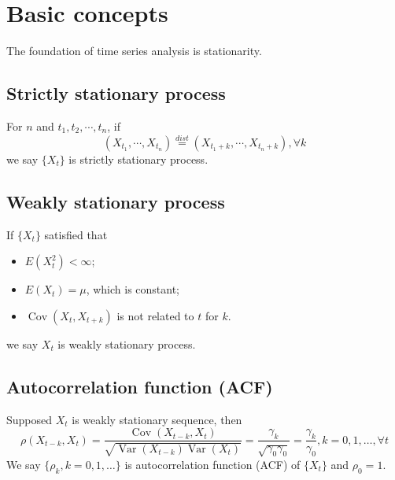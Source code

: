 \documentclass{article}
\title{\courseName}
\author{Thompson Hu}
\date{} %
\begin{document}
\maketitle
\thispagestyle{fancy}

\section{Basic concepts}
The foundation of time series analysis is stationarity.

\subsection{Strictly stationary process}
For $n$ and $t_1,t_2,\cdots,t_n$, if
\begin{equation*}
\left(X_{t_{1}}, \cdots, X_{t_{n}}\right) \stackrel{d i s t}{=}\left(X_{t_{1}+k}, \cdots, X_{t_{n}+k}\right), \forall k
\end{equation*}
we say $\{X_t\}$ is strictly stationary process.

\subsection{Weakly stationary process}
If $\{X_t\}$ satisfied that
\begin{itemize}
	\item $E\left(X_{t}^{2}\right)<\infty$;
	\item $E(X_t) = \mu$, which is constant;
	\item $\operatorname{Cov}\left(X_{t}, X_{t+k}\right)$ is not related to $t$ for $k$.
\end{itemize}
we say $X_t$ is weakly stationary process.

\subsection{Autocorrelation function (ACF)}
Supposed $X_t$ is weakly stationary sequence, then
\begin{equation}\label{acf1}
\rho\left(X_{t-k}, X_{t}\right)=\frac{\operatorname{Cov}\left(X_{t-k}, X_{t}\right)}{\sqrt{\operatorname{Var}\left(X_{t-k}\right) \operatorname{Var}\left(X_{t}\right)}}=\frac{\gamma_{k}}{\sqrt{\gamma_{0} \gamma_{0}}}=\frac{\gamma_{k}}{\gamma_{0}}, k=0,1, \ldots, \forall t
\end{equation}
We say $\{\rho_k, k = 0, 1, \dots\}$ is autocorrelation function (ACF) of $\{X_t\}$ and $\rho_0 = 1$.\\
\end{document}
